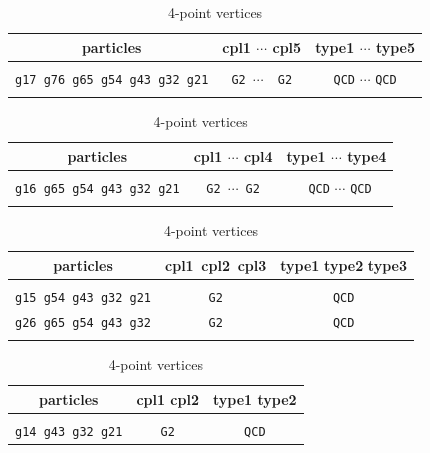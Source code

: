 \documentclass[a4paper,11pt]{article}
\begin{document}
\begin{table}
\begin{center}
\small
\caption{7-point vertices}
\label{7}
\begin{tabular}{ccc}
\hline
\hline
particles&cpl1 $\cdots$ cpl5&type1 $\cdots$ type5\\
\hline\\
 {\tt g17 g76 g65 g54 g43 g32 g21}&{\tt G2}\;\, $\cdots$\;\, {\tt
     G2}&{\tt QCD}\;\; $\cdots$\;\; {\tt QCD}\\\\
\hline
\hline
\end{tabular}
\vspace{2em}
\caption{6-point vertices}
\label{6}
\begin{tabular}{ccc}
\hline
\hline
particles&cpl1 $\cdots$ cpl4&type1 $\cdots$ type4\\
\hline\\
{\tt g16 g65 g54 g43 g32 g21}&{\tt G2}\;\, $\cdots$\;\, {\tt G2}& {\tt
	 QCD}\;\; $\cdots$\;\; {\tt QCD}\\\\
\hline
\hline
\end{tabular}
\vspace{2em}
\caption{5-point vertices}
\label{5}
\begin{tabular}{ccc}
\hline
\hline
particles&cpl1\, cpl2\, cpl3&type1\,\,type2\,\,type3\\
\hline\\
{\tt g15 g54 g43 g32 g21}&{\tt G2}\hspace{1.2em}{\tt
     G2}\hspace{1.2em}{\tt G2}&{\tt QCD}\hspace{1.2em}{\tt
	 QCD}\hspace{1.2em}{\tt QCD}\\
{\tt g26 g65 g54 g43 g32}&{\tt G2}\hspace{1.2em}{\tt
     G2}\hspace{1.2em}{\tt G2}&{\tt QCD}\hspace{1.2em}{\tt
	 QCD}\hspace{1.2em}{\tt QCD}\\\\
\hline
\hline
\end{tabular}
\vspace{2em}
\caption{4-point vertices}
\label{4}
\begin{tabular}{ccc}
\hline
\hline
particles&cpl1 cpl2&type1 type2\\
\hline\\
{\tt g14 g43 g32 g21}&{\tt G2}\;\;\;\;{\tt G2}&{\tt QCD}\;\;\;\;{\tt
}
\end{tabular}
\end{center}
\end{table}
\end{document}
